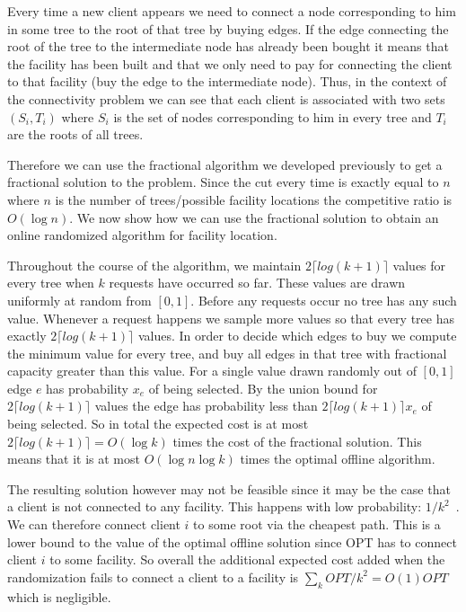 Every time a new client appears we need to connect a node corresponding to him in some tree to the root of that tree by buying edges. If the edge connecting the root of the tree to the intermediate node has already been bought it means that the facility has been built and that we only need to pay for connecting the client to that facility (buy the edge to the intermediate node). Thus, in the context of the connectivity problem we can see that each client is associated with two sets $(S_i,T_i)$ where $S_i$ is the set of nodes corresponding to him in every tree and $T_i$ are the roots of all trees.

Therefore we can use the fractional algorithm we developed previously to get a fractional solution to the problem. Since the cut every time is exactly equal to $n$ where $n$ is the number of trees/possible facility locations the competitive ratio is $O(\log n)$. We now show how we can use the fractional solution to obtain an online randomized algorithm for facility location.

Throughout the course of the algorithm, we maintain $2 \lceil log(k+1) \rceil$ values for every tree when $k$ requests have occurred so far. These values are drawn uniformly at random from $[0,1]$. Before any requests occur no tree has any such value. Whenever a request happens we sample more values so that every tree has exactly $2 \lceil log(k+1) \rceil$ values. In order to decide which edges to buy we compute the minimum value for every tree, and buy all edges in that tree with fractional capacity greater than this value. For a single value drawn randomly out of $[0,1]$ edge $e$ has probability $x_e$ of being selected. By the union bound for $2 \lceil log(k+1) \rceil$ values the edge has probability less than $2 \lceil log(k+1) \rceil x_e$ of being selected. So in total the expected cost is at most $2 \lceil log(k+1) \rceil = O(\log k)$ times the cost of the fractional solution. This means that it is at most $O(\log n \log k)$ times the optimal offline algorithm.

The resulting solution however may not be feasible since it may be the case that a client is not connected to any facility.
This happens with low probability: $1/k^{2}$~\cite{naor11:node-weighted-steiner-tree}.
We can therefore connect client $i$ to some root via the cheapest path. This is a lower bound to the value of the optimal offline solution since OPT has to connect client $i$ to some facility. So overall the additional expected cost added when the randomization fails to connect a client to a facility is $\sum_{k} OPT/k^2 = O(1) OPT$ which is negligible.

